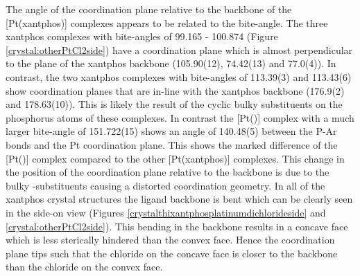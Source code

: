 The angle of the coordination plane relative to the backbone of the [Pt(xantphos)] complexes appears to be related to the bite-angle.  The three xantphos complexes with bite-angles of 99.165 - 100.874\degrees{} (Figure \ref{crystal:otherPtCl2side}) have a coordination plane which is almost perpendicular to the plane of the xantphos backbone (105.90(12)\degrees{}, 74.42(13)\degrees{} and 77.0(4)\degrees).  In contrast, the two xantphos complexes with bite-angles of 113.39(3) and 113.43(6)\degrees{} show coordination planes that are in-line with the xantphos backbone (176.9(2)\degrees{} and 178.63(10)\degrees{}).  This is likely the result of the cyclic bulky substituents on the phosphorus atoms of these complexes.  In contrast the [Pt(\tButhixantphos)] complex with a much larger bite-angle of 151.722(15)\degrees{} shows an angle of 140.48(5)\degrees{} between the P-Ar bonds and the Pt coordination plane.  This shows the marked difference of the [Pt(\tButhixantphos)] complex compared to the other [Pt(xantphos)] complexes.  This change in the position of the coordination plane relative to the backbone is due to the bulky \tBu-substituents causing a distorted \trans{} coordination geometry.  In all of the xantphos crystal structures the ligand backbone is bent which can be clearly seen in the side-on view (Figures \ref{crystalthixantphosplatinumdichlorideside} and \ref{crystal:otherPtCl2side}).  This bending in the backbone results in a concave face which is less sterically hindered than the convex face.  Hence the coordination plane tips such that the chloride on the concave face is closer to the backbone than the chloride on the convex face.  

